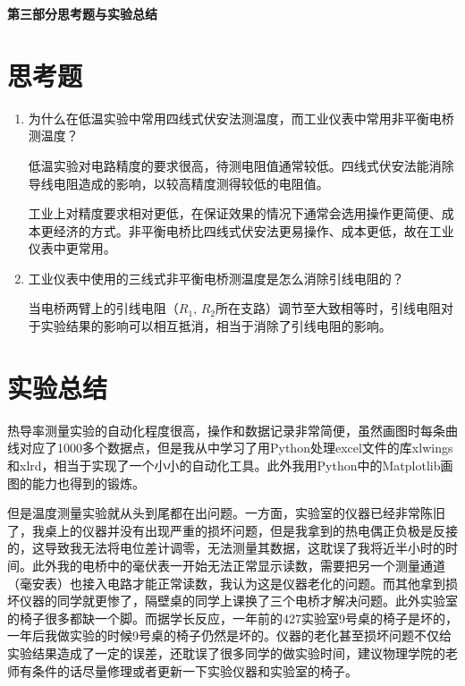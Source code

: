 \documentclass[12pt]{article}
\begin{document}
\newpage

\begin{center}
    \Large \textbf{第三部分\quad 思考题与实验总结}
\end{center}
\setcounter{section}{0}

\section{思考题}
\begin{enumerate}
    \item {\kaishu 为什么在低温实验中常用四线式伏安法测温度，而工业仪表中常用非平衡电桥测温度？}
    
    低温实验对电路精度的要求很高，待测电阻值通常较低。四线式伏安法能消除导线电阻造成的影响，以较高精度测得较低的电阻值。

    工业上对精度要求相对更低，在保证效果的情况下通常会选用操作更简便、成本更经济的方式。非平衡电桥比四线式伏安法更易操作、成本更低，故在工业仪表中更常用。
    
    \item {\kaishu 工业仪表中使用的三线式非平衡电桥测温度是怎么消除引线电阻的？}
    
    当电桥两臂上的引线电阻（$ R_1,\,R_2 $所在支路）调节至大致相等时，引线电阻对于实验结果的影响可以相互抵消，相当于消除了引线电阻的影响。

\end{enumerate}

\section{实验总结}
热导率测量实验的自动化程度很高，操作和数据记录非常简便，虽然画图时每条曲线对应了1000多个数据点，但是我从中学习了用Python处理excel文件的库xlwings和xlrd，相当于实现了一个小小的自动化工具。此外我用Python中的Matplotlib画图的能力也得到的锻炼。

但是温度测量实验就从头到尾都在出问题。一方面，实验室的仪器已经非常陈旧了，我桌上的仪器并没有出现严重的损坏问题，但是我拿到的热电偶正负极是反接的，这导致我无法将电位差计调零，无法测量其数据，这耽误了我将近半小时的时间。此外我的电桥中的毫伏表一开始无法正常显示读数，需要把另一个测量通道（毫安表）也接入电路才能正常读数，我认为这是仪器老化的问题。而其他拿到损坏仪器的同学就更惨了，隔壁桌的同学上课换了三个电桥才解决问题。此外实验室的椅子很多都缺一个脚。而据学长反应，一年前的427实验室9号桌的椅子是坏的，一年后我做实验的时候9号桌的椅子仍然是坏的。仪器的老化甚至损坏问题不仅给实验结果造成了一定的误差，还耽误了很多同学的做实验时间，建议物理学院的老师有条件的话尽量修理或者更新一下实验仪器和实验室的椅子。
\end{document}
